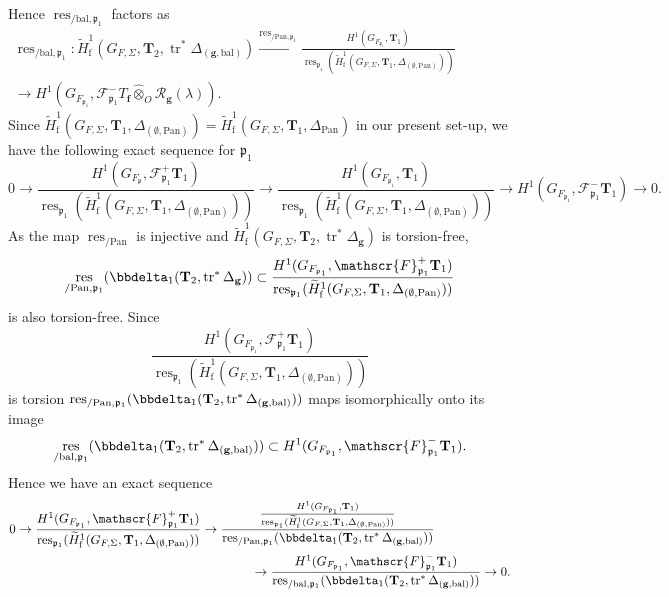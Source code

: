 \documentclass[10pt]{amsart}
\numberwithin{equation}{section}
\theoremstyle{definition}
\theoremstyle{remark} %
\newcommand{\pan}{\mathrm{Pan}}
\DeclareMathOperator{\res}{res}
\renewcommand{\b}{\mathrm{bal}}
\newcommand{\f}{\mathbf{f}}
\newcommand{\scrF}{\mathscr{F}}
\newcommand{\g}{\mathbf{g}}
\newcommand{\p}{\mathfrak{p}}
\newcommand{\R}{\mathcal{R}}
\newcommand{\T}{\mathbf{T}}
\newcommand{\hotimes}{\widehat{\otimes}}
\begin{document}
		Hence $  \res_{/\b, \p_1} $ factors as 
		\begin{align*}
			\res_{/\b, \p_1} \colon \widetilde{H}^1_{\mathrm{f}}(G_{F,\Sigma}, \T_2, \operatorname{tr}^*\Delta_{(\g,\b)}) \xrightarrow{\res_{/\pan,\p_1}} \frac{H^1(G_{F_{\p_1}}, \T_{1})}{\res_{\p_1}(\widetilde{H}^1_{\mathrm{f}}(G_{F,\Sigma},\T_{1}, \Delta_{(\emptyset,\pan)}))} \qquad \qquad \qquad \\
			\rightarrow  H^1(G_{F_{\p_1}},\scrF^-_{\p_1} T_\f \hotimes_O \R_{\g}(\lambda)) .
		\end{align*}
		Since $ \widetilde{H}^1_{\mathrm{f}}(G_{F,\Sigma},\T_{1}, \Delta_{(\emptyset,\pan)}) = \widetilde{H}^1_{\mathrm{f}}(G_{F,\Sigma},\T_{1}, \Delta_{\pan}) $ in our present set-up, we have the following exact sequence for $ \p_1 $
		$$ 0 \rightarrow \frac{H^1(G_{F_\p},\scrF^+_{\p_1} \T_{1})}{\res_{\p_1}(\widetilde{H}^1_{\mathrm{f}}(G_{F,\Sigma},\T_{1}, \Delta_{(\emptyset,\pan)})) } \rightarrow \frac{H^1(G_{F_{\p_1}},\T_{1})}{\res_{\p_1}(\widetilde{H}^1_{\mathrm{f}}(G_{F,\Sigma},\T_{1}, \Delta_{(\emptyset,\pan)})) } \rightarrow H^1(G_{F_{\p_1}},\scrF^-_{\p_1} \T_{1}) \rightarrow 0 .$$
		As the map $ \res_{/\pan} $ is injective and $ \widetilde{H}^1_{\mathrm{f}}(G_{F,\Sigma}, \T_2, \operatorname{tr}^*\Delta_{\g}) $ is torsion-free, 
		$$ \res_{/\pan, \p_1}(\bbdelta_1(\T_2, \operatorname{tr}^*\Delta_{\g})) \subset \frac{H^1(G_{F_{\p_1}},\scrF^+_{\p_1} \T_{1})}{\res_{\p_1}(\widetilde{H}^1_{\mathrm{f}}(G_{F,\Sigma},\T_{1}, \Delta_{(\emptyset,\pan)})) } $$ 
		is also torsion-free.
		Since $$ \frac{H^1(G_{F_{\p_1}},\scrF^+_{\p_1} \T_{1})}{\res_{\p_1}(\widetilde{H}^1_{\mathrm{f}}(G_{F,\Sigma},\T_{1}, \Delta_{(\emptyset,\pan)})) } $$ is torsion
		$\res_{/\pan, \p_1}(\bbdelta_1(\T_2, \operatorname{tr}^*\Delta_{(\g,\b)}))$ maps isomorphically onto its image 
		$$ \res_{/\b, \p_1}(\bbdelta_1(\T_2, \operatorname{tr}^*\Delta_{(\g,\b)})) \subset H^1(G_{F_{\p_1}},\scrF^-_{\p_1} \T_{1}). $$
		Hence we have an exact sequence
		\begin{align}
			\label{exact_seq_rank1}
			\begin{aligned}
				0 \rightarrow \frac{H^1(G_{F_{\p_1}},\scrF^+_{\p_1} \T_{1})}{\res_{\p_1}(\widetilde{H}^1_{\mathrm{f}}(G_{F,\Sigma},\T_{1}, \Delta_{(\emptyset,\pan)})) } \rightarrow \dfrac{\frac{H^1(G_{F_{\p_1}},\T_{1})}{\res_{\p_1}(\widetilde{H}^1_{\mathrm{f}}(G_{F,\Sigma},\T_{1}, \Delta_{(\emptyset,\pan)})) }}{\res_{/\pan, \p_1}(\bbdelta_1(\T_2, \operatorname{tr}^*\Delta_{(\g,\b)}))} \qquad \qquad \qquad \\
				\rightarrow \frac{H^1(G_{F_{\p_1}},\scrF^-_{\p_1} \T_{1})}{ \res_{/\b, \p_1}(\bbdelta_1(\T_2, \operatorname{tr}^*\Delta_{(\g,\b)}))} \rightarrow 0.
			\end{aligned}
		\end{align} 
\end{document}
